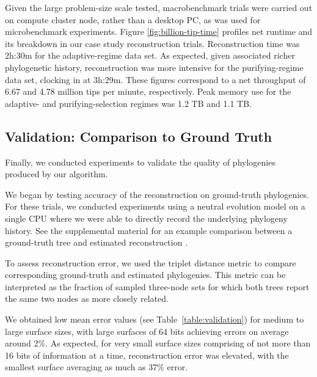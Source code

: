 Given the large problem-size scale tested, macrobenchmark trials were carried out on compute cluster node, rather than a desktop PC, as was used for microbenchmark experiments.
Figure \ref{fig:billion-tip-time} profiles net runtime and its breakdown in our case study reconstruction trials.
Reconstruction time was 2h:30m for the adaptive-regime data set.
As expected, given associated richer phylogenetic history, reconstruction was more intensive for the purifying-regime data set, clocking in at 3h:29m.
These figures correspond to a net throughput of 6.67 and 4.78 million tips per minute, respectively.
Peak memory use for the adaptive- and purifying-selection regimes was 1.2 TB and 1.1 TB.

\subsection{Validation: Comparison to Ground Truth}

Finally, we conducted experiments to validate the quality of phylogenies produced by our algorithm.

We began by testing accuracy of the reconstruction on ground-truth phylogenies.
For these trials, we conducted experiments using a neutral evolution model on a single CPU where we were able to directly record the underlying phylogeny history. See the supplemental material for an example comparison between a ground-truth tree and estimated reconstruction \citep{supplemental}.

To assess reconstruction error, we used the triplet distance metric to compare corresponding ground-truth and estimated phylogenies.
This metric can be interpreted as the fraction of sampled three-node sets for which both trees report the same two nodes as more closely related.



We obtained low mean error values (see Table~\ref{table:validation}) for medium to large surface sizes, with large surfaces of 64 bits achieving errors on average around 2\%. 
As expected, for very small surface sizes comprising of not more than 16 bits of information at a time, reconstruction error was elevated, with the smallest surface averaging as much as 37\% error.

